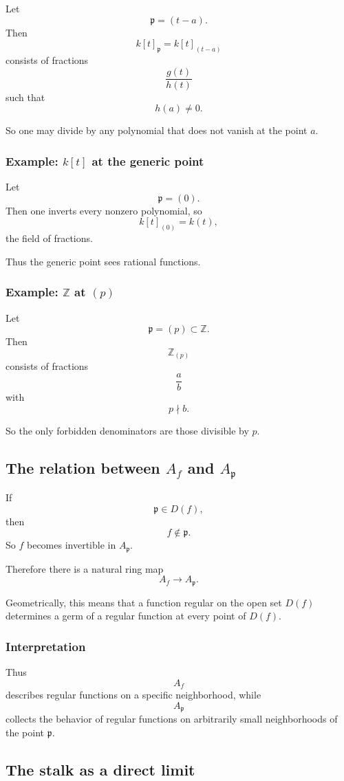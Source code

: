 \documentclass[12pt,a4paper]{article}
\theoremstyle{notespace}
\newcommand{\mf}{\mathfrak}
\theoremstyle{definition}
\begin{document}
Let
\[
\mf p=(t-a).
\]
Then
\[
k[t]_{\mf p}=k[t]_{(t-a)}
\]
consists of fractions
\[
\frac{g(t)}{h(t)}
\]
such that
\[
h(a)\neq 0.
\]

So one may divide by any polynomial that does not vanish at the point \(a\).

\subsubsection{Example: \(k[t]\) at the generic point}

Let
\[
\mf p=(0).
\]
Then one inverts every nonzero polynomial, so
\[
k[t]_{(0)}=k(t),
\]
the field of fractions.

Thus the generic point sees rational functions.

\subsubsection{Example: \(\mathbb Z\) at \((p)\)}

Let
\[
\mf p=(p)\subset \mathbb Z.
\]
Then
\[
\mathbb Z_{(p)}
\]
consists of fractions
\[
\frac{a}{b}
\]
with
\[
p\nmid b.
\]

So the only forbidden denominators are those divisible by \(p\).

\subsection{The relation between \(A_f\) and \(A_{\mf p}\)}

If
\[
\mf p\in D(f),
\]
then
\[
f\notin \mf p.
\]
So \(f\) becomes invertible in \(A_{\mf p}\).

Therefore there is a natural ring map
\[
A_f \longrightarrow A_{\mf p}.
\]

Geometrically, this means that a function regular on the open set \(D(f)\) determines a germ of a regular function at every point of \(D(f)\).

\subsubsection{Interpretation}

Thus
\[
A_f
\]
describes regular functions on a specific neighborhood, while
\[
A_{\mf p}
\]
collects the behavior of regular functions on arbitrarily small neighborhoods of the point \(\mf p\).

\subsection{The stalk as a direct limit}
\end{document}
